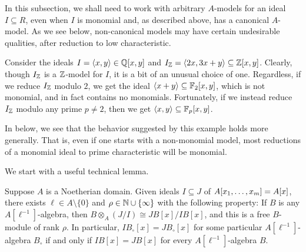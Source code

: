 \documentclass{amsart}
\begin{document}
In this subsection, we shall need to work with arbitrary $A$-models for an ideal $I \subseteq R$, even when $I$ is monomial and, as described above, has a canonical $A$-model.  As we see below, non-canonical models may have certain undesirable qualities, after reduction to low characteristic.

\begin{example}
Consider the ideals $I=\langle x, y \rangle \in \mathbb{Q}[x,y]$ and $I_{\mathbb{Z}} = \langle 2x, 3x+y \rangle \subseteq \mathbb{Z}[x,y]$.  Clearly, though $I_{\mathbb{Z}}$ is a $\mathbb{Z}$-model for $I$, it is a bit of an unusual choice of one.
Regardless, if we reduce $I_{\mathbb{Z}}$ modulo $2$, we get the ideal $\langle x+y \rangle \subseteq \mathbb{F}_2[x,y]$, which is not monomial, and in fact contains no monomials.  Fortunately, if we instead reduce $I_{\mathbb{Z}}$ modulo any prime $p \neq 2$, then we get $\langle x, y \rangle \subseteq \mathbb{F}_p[x,y]$.
\end{example}

In  below, we see that the behavior suggested by this example holds more generally.  That is, even if one starts with a non-monomial model, most reductions of a monomial ideal to prime characteristic will be monomial.

We start with a useful technical lemma.

\begin{proposition}
   \label{comparing expansions:  P}
   Suppose $A$ is a Noetherian domain.
   Given ideals $I \subseteq J$ of $A[x_1, \ldots, x_m] = A[x]$, there exists $\ell \in A\setminus\{0\}$ and $\rho \in \mathbb{N} \cup \{ \infty \}$ with the following property\textup:
   If $B$ is any $A[\ell^{-1}]$-algebra, then $B \otimes_A (J/I) \cong JB[x]/IB[x]$, and this is a free $B$-module of rank $\rho$.
   In particular, $IB_{\circ}[x]=JB_{\circ}[x]$ for some particular $A[\ell^{-1}]$-algebra $B_{\circ}$ if and only if $IB[x]=JB[x]$ for every $A[\ell^{-1}]$-algebra $B$.
\end{proposition}
\end{document}
